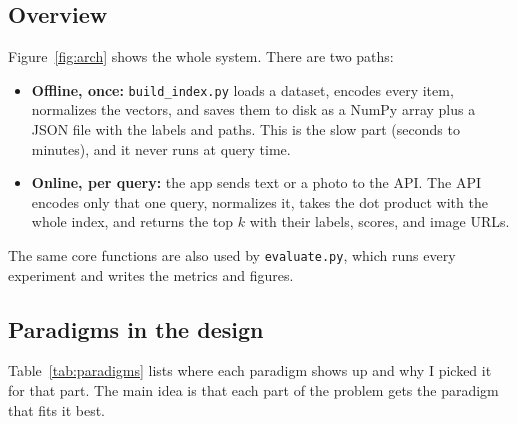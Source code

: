 \documentclass{article}
\begin{document}
\subsection{Overview}

Figure~\ref{fig:arch} shows the whole system. There are two paths:
\begin{itemize}
  \item \textbf{Offline, once:} \texttt{build\_index.py} loads a dataset, encodes every item, normalizes the vectors, and saves them to disk as a NumPy array plus a JSON file with the labels and paths. This is the slow part (seconds to minutes), and it never runs at query time.
  \item \textbf{Online, per query:} the app sends text or a photo to the API. The API encodes only that one query, normalizes it, takes the dot product with the whole index, and returns the top $k$ with their labels, scores, and image URLs.
\end{itemize}
The same core functions are also used by \texttt{evaluate.\allowbreak py}, which runs every experiment and writes the metrics and figures.

\subsection{Paradigms in the design}

Table~\ref{tab:paradigms} lists where each paradigm shows up and why I picked it for that part. The main idea is that each part of the problem gets the paradigm that fits it best.
\end{document}
